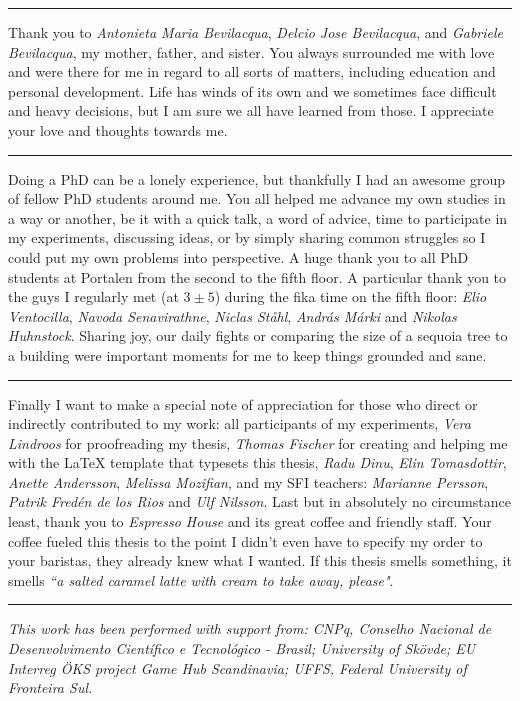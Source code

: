 \vspace{7pt}\hrule\vspace{5pt}

Thank you to \textit{Antonieta Maria Bevilacqua}, \textit{Delcio Jose Bevilacqua}, and \textit{Gabriele Bevilacqua}, my mother, father, and sister. You always surrounded me with love and were there for me in regard to all sorts of matters, including education and personal development. Life has winds of its own and we sometimes face difficult and heavy decisions, but I am sure we all have learned from those. I appreciate your love and thoughts towards me.

\vspace{7pt}\hrule\vspace{5pt}

Doing a PhD can be a lonely experience, but thankfully I had an awesome group of fellow PhD students around me. You all helped me advance my own studies in a way or another, be it with a quick talk, a word of advice, time to participate in my experiments, discussing ideas, or by simply sharing common struggles so I could put my own problems into perspective. A huge thank you to all PhD students at Portalen from the second to the fifth floor. A particular thank you to the guys I regularly met (at $3\pm5$) during the fika time on the fifth floor: \textit{Elio Ventocilla}, \textit{Navoda Senavirathne}, \textit{Niclas St{\aa}hl}, \textit{Andr{\'a}s M{\'a}rki} and \textit{Nikolas Huhnstock}. Sharing joy, our daily fights or comparing the size of a sequoia tree to a building were important moments for me to keep things grounded and sane.

\vspace{7pt}\hrule\vspace{5pt}

Finally I want to make a special note of appreciation for those who direct or indirectly contributed to my work: all participants of my experiments, \textit{Vera Lindroos} for proofreading my thesis, \textit{Thomas Fischer} for creating and helping me with the {\LaTeX} template that typesets this thesis, \textit{Radu Dinu}, \textit{Elin Tomasdottir}, \textit{Anette Andersson}, \textit{Melissa Mozifian}, and my SFI teachers: \textit{Marianne Persson}, \textit{Patrik Fred{\'e}n de los Rios} and \textit{Ulf Nilsson}. Last but in absolutely no circumstance least, thank you to \textit{Espresso House} and its great coffee and friendly staff. Your coffee fueled this thesis to the point I didn't even have to specify my order to your baristas, they already knew what I wanted. If this thesis smells something, it smells \textit{``a salted caramel latte with cream to take away, please"}.

\vspace{7pt}\hrule\vspace{5pt}

\textit{This work has been performed with support from: CNPq, Conselho Nacional de Desenvolvimento Cient\'{i}fico e Tecnol\'{o}gico - Brasil; University of Sk\"ovde; EU Interreg \"OKS project Game Hub Scandinavia; UFFS, Federal University of Fronteira Sul.}
